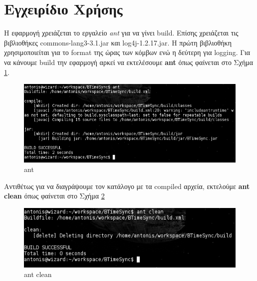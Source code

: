 \documentclass{article}
\begin{document}
\section{Εγχειρίδιο Χρήσης}
Η εφαρμογή χρειάζεται το εργαλείο \emph{ant} για να γίνει build. Επίσης
χρειάζεται τις βιβλιοθήκες commons-lang3-3.1.jar και log4j-1.2.17.jar. Η πρώτη
βιβλιοθήκη χρησιμοποιείται για το format της ώρας των κόμβων ενώ η δεύτερη για
logging. Για να κάνουμε build την εφαρμογή αρκεί να εκτελέσουμε \textbf{ant}
όπως φαίνεται στο Σχήμα \ref{ant}.
\begin{figure}[tbh]
\centering
\includegraphics[scale=0.7]{photos/ant_build.png}
\caption{ant}
\label{ant}
\end{figure}

Αντιθέτως για να διαγράψουμε τον κατάλογο με τα compiled αρχεία, εκτελούμε 
\textbf{ant clean} όπως φαίνεται στο Σχήμα \ref{ant_clean}
\begin{figure}[tbh]
\centering
\includegraphics[scale=0.7]{photos/ant_clean.png}
\caption{ant clean}
\label{ant_clean}
\end{figure}
\end{document}
